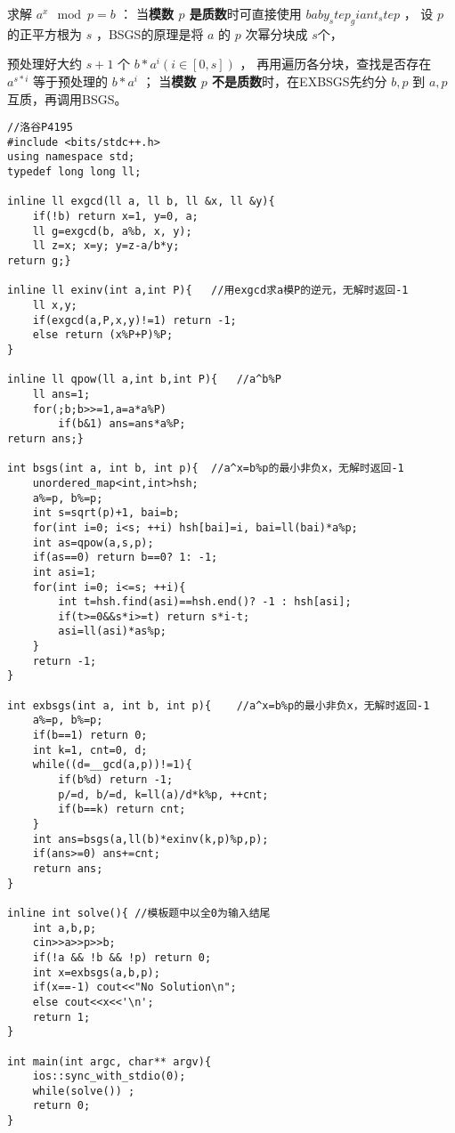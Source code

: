 求解 $a^x \mod p = b$ ：
当\textbf{模数 $p$ 是质数}时可直接使用 $baby_step_giant_step$ ， 
设 $p$ 的正平方根为 $s$ ，BSGS的原理是将 $a$ 的 $p$ 次幂分块成 $s$个，

预处理好大约 $s+1$ 个 $b*a^i(i\in[0,s])$ ， 
再用遍历各分块，查找是否存在 $a^{s*i}$ 等于预处理的 $b*a^i$ ； 
当\textbf{模数 $p$ 不是质数}时，在EXBSGS先约分 $b,p$ 到 $a,p$ 互质，再调用BSGS。
\begin{lstlisting}
//洛谷P4195 
#include <bits/stdc++.h>
using namespace std;
typedef long long ll;

inline ll exgcd(ll a, ll b, ll &x, ll &y){
	if(!b) return x=1, y=0, a;
	ll g=exgcd(b, a%b, x, y);
	ll z=x; x=y; y=z-a/b*y;
return g;}

inline ll exinv(int a,int P){	//用exgcd求a模P的逆元，无解时返回-1
	ll x,y;
	if(exgcd(a,P,x,y)!=1) return -1;
	else return (x%P+P)%P;
}

inline ll qpow(ll a,int b,int P){	//a^b%P 
	ll ans=1;
	for(;b;b>>=1,a=a*a%P)
		if(b&1) ans=ans*a%P;
return ans;}

int bsgs(int a, int b, int p){	//a^x=b%p的最小非负x，无解时返回-1
	unordered_map<int,int>hsh;
	a%=p, b%=p;
	int s=sqrt(p)+1, bai=b;
	for(int i=0; i<s; ++i) hsh[bai]=i, bai=ll(bai)*a%p;
	int as=qpow(a,s,p);
	if(as==0) return b==0? 1: -1;
	int asi=1;
	for(int i=0; i<=s; ++i){
		int t=hsh.find(asi)==hsh.end()? -1 : hsh[asi];
		if(t>=0&&s*i>=t) return s*i-t;
		asi=ll(asi)*as%p;
	}
	return -1;
}

int exbsgs(int a, int b, int p){	//a^x=b%p的最小非负x，无解时返回-1
	a%=p, b%=p;
	if(b==1) return 0;
	int k=1, cnt=0, d;
	while((d=__gcd(a,p))!=1){
		if(b%d) return -1;
		p/=d, b/=d, k=ll(a)/d*k%p, ++cnt;
		if(b==k) return cnt;
	}
	int ans=bsgs(a,ll(b)*exinv(k,p)%p,p);
	if(ans>=0) ans+=cnt;
	return ans;
}

inline int solve(){	//模板题中以全0为输入结尾
	int a,b,p;
	cin>>a>>p>>b;
	if(!a && !b && !p) return 0;
	int x=exbsgs(a,b,p);
	if(x==-1) cout<<"No Solution\n";
	else cout<<x<<'\n';
	return 1;
}

int main(int argc, char** argv){
	ios::sync_with_stdio(0);
	while(solve()) ;
	return 0;
}

\end{lstlisting}